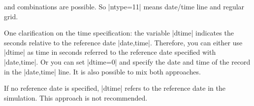 and combinations are possible. So |ntype=11| means date/time line 
and regular grid.

One clarification on the time specification: the variable |dtime| indicates the
seconds relative to the reference date |date,time|.
Therefore, you can either use |dtime| as time
in seconds referred to the reference date specified with |date,time|. Or you
can set |dtime=0| and specify the date and time of the record in the
|date,time| line. It is also possible to mix both approaches. 

If no reference date is specified, |dtime| refers to the reference
date in the simulation. This approach is not recommended.
